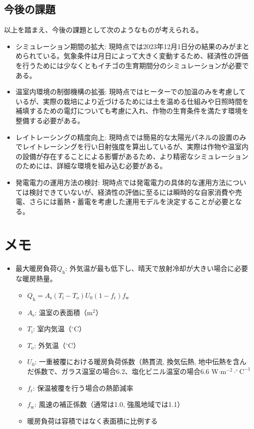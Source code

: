 \documentclass[uplatex,dvipdfmx,nomag,a4paper,oneside,onecolumn,12pt]{bxjsreport} %
\begin{document}
\section{今後の課題}
以上を踏まえ、今後の課題として次のようなものが考えられる。
\begin{itemize}
    \item シミュレーション期間の拡大: 現時点では2023年12月1日分の結果のみがまとめられている。気象条件は月日によって大きく変動するため、経済性の評価を行うためには少なくともイチゴの生育期間分のシミュレーションが必要である。
    \item 温室内環境の制御機構の拡張: 現時点ではヒーターでの加温のみを考慮しているが、実際の栽培により近づけるためには土を温める仕組みや日照時間を補填するための電灯についても考慮に入れ、作物の生育条件を満たす環境を整備する必要がある。
    \item レイトレーシングの精度向上: 現時点では簡易的な太陽光パネルの設置のみでレイトレーシングを行い日射強度を算出しているが、実際は作物や温室内の設備が存在することによる影響があるため、より精密なシミュレーションのためには、詳細な環境を組み込む必要がある。
    \item 発電電力の運用方法の検討: 現時点では発電電力の具体的な運用方法については検討できていないが、経済性の評価に至るには瞬時的な自家消費や売電、さらには蓄熱・蓄電を考慮した運用モデルを決定することが必要となる。
\end{itemize}

\chapter{メモ}
\begin{itemize}
    \item 最大暖房負荷\(Q_\text{h}\): 外気温が最も低下し、晴天で放射冷却が大きい場合に必要な暖房熱量\cite{Samejima2021}。
    \begin{itemize}
        \item \(Q_\text{h} = A_\text{s} (T_\text{i} - T_\text{o}) U_\text{0} (1 - f_\text{r}) f_\text{w}\)
        \item \(A_\text{s}\): 温室の表面積（m\(^2\)）
        \item \(T_\text{i}\): 室内気温（\(^\circ \text{C}\)）
        \item \(T_\text{o}\): 外気温（\(^\circ \text{C}\)）
        \item \(U_\text{0}\): 一重被覆における暖房負荷係数（熱貫流, 換気伝熱, 地中伝熱を含んだ係数で、ガラス温室の場合6.2、塩化ビニル温室の場合6.6 W\(\cdot\)m\(^{-2}\cdot ^\circ \text{C}^{-1}\)
        \item \(f_\text{r}\): 保温被覆を行う場合の熱節減率
        \item \(f_\text{w}\): 風速の補正係数（通常は1.0,  強風地域では1.1）
        \item 暖房負荷は容積ではなく表面積に比例する
    \end{itemize}
\end{itemize}
\end{document}
